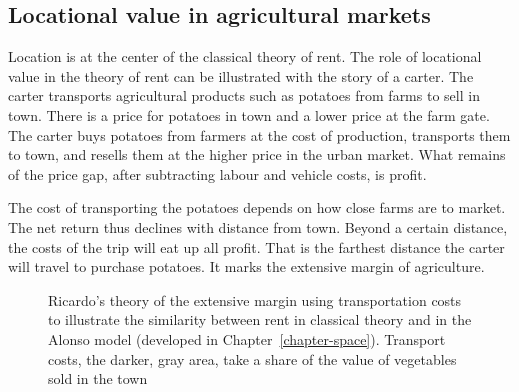 
\subsection{Locational value in agricultural markets} \label{section-rent-carter}
Location is at the center of the classical theory of rent. The role of locational value in the theory of \gls{rent} can be illustrated with the story of a carter. The carter transports agricultural products such as potatoes from farms to sell in town. %
There is a price for potatoes in town and a lower price at the farm gate. The carter buys potatoes from farmers at the cost of production, transports them to town, and resells them at the higher price in the urban market. What remains of the price gap, after subtracting labour and vehicle costs, is profit. %

The cost of transporting the potatoes depends on how close farms are to market.  
The net return thus declines with distance from town. Beyond a certain distance, the costs of the trip will eat up all profit. That is the farthest distance the carter will travel to purchase potatoes. It marks the \gls{extensive margin} of agriculture. 

\begin{figure}[htb]
\begin{center}

\caption[Ricardo's theory of extensive margin.]{Ricardo's theory of the extensive margin using transportation costs to illustrate the similarity between rent in classical theory and in the Alonso model (developed in  Chapter~\ref{chapter-space}). Transport costs, the darker, gray area, take a share of the value of vegetables sold in the town}
\label{fig-rent-ricardo}
\end{center}
\end{figure}


